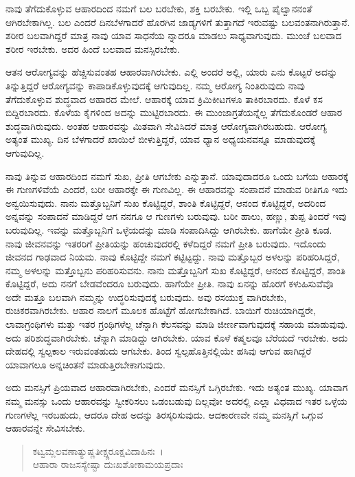 ನಾವು ತೆಗೆದುಕೊಳ್ಳುವ ಆಹಾರದಿಂದ ನಮಗೆ ಬಲ ಬರಬೇಕು, ಶಕ್ತಿ ಬರಬೇಕು. ಇಲ್ಲಿ ಒಬ್ಬ ಪೈಲ್ವಾನನಂತೆ ಆಗಿರಬೇಕಾಗಿಲ್ಲ. ಬಲ ಎಂದರೆ ದಿನಬೆಳಗಾದರೆ ಹೊರಗಿನ ಜಾಡ್ಯಗಳಿಗೆ ತುತ್ತಾಗದೆ ಇರುವಷ್ಟು ಬಲವಂತನಾಗಿರುತ್ತಾನೆ. ಶರೀರ ಬಲವಾಗಿದ್ದರೆ ಮಾತ್ರ ನಾವು ಯಾವ ಸಾಧನೆಯ ನ್ನಾದರೂ ಮಾಡಲು ಸಾಧ್ಯವಾಗುವುದು. ಮುಂಚೆ ಬಲವಾದ ಶರೀರ ಇರಬೇಕು. ಅದರ ಹಿಂದೆ ಬಲವಾದ ಮನಸ್ಸಿರಬೇಕು.

ಆತನ ಆರೋಗ್ಯವನ್ನು ಹೆಚ್ಚಿಸುವಂತಹ ಆಹಾರವಾಗಿರಬೇಕು. ಎಲ್ಲಿ ಅಂದರೆ ಅಲ್ಲಿ, ಯಾರು ಏನು ಕೊಟ್ಟರೆ ಅದನ್ನು ತಿನ್ನುತ್ತಿದ್ದರೆ ಆರೋಗ್ಯವನ್ನು ಕಾಪಾಡಿಕೊಳ್ಳುವುದಕ್ಕೆ ಆಗುವುದಿಲ್ಲ. ನಮ್ಮ ಆರೋಗ್ಯ ನಿಂತಿರುವುದು ನಾವು ತೆಗೆದುಕೊಳ್ಳುವ ಶುದ್ಧವಾದ ಆಹಾರದ ಮೇಲೆ. ಆಹಾರಕ್ಕೆ ಯಾವ ಕ್ರಿಮಿಕೀಟಗಳೂ ತಾಕಿರಬಾರದು. ಕೊಳೆ ಕಸ ಬಿದ್ದಿರಬಾರದು. ಕೊಳೆಯ ಕೈಗಳಿಂದ ಅದನ್ನು ಮುಟ್ಟಿರಬಾರದು. ಈ ಮುಂಜಾಗ್ರತೆಯನ್ನೆಲ್ಲ ತೆಗೆದುಕೊಂಡರೆ ಆಹಾರ ಶುದ್ಧವಾಗಿರುವುದು. ಅಂತಹ ಆಹಾರವನ್ನು ಮಿತವಾಗಿ ಸೇವಿಸಿದರೆ ಮಾತ್ರ ಆರೋಗ್ಯವಾಗಿರಬಹುದು. ಆರೋಗ್ಯ ಅತ್ಯಂತ ಮುಖ್ಯ. ದಿನ ಬೆಳಗಾದರೆ ಖಾಯಿಲೆ ಬೀಳುತ್ತಿದ್ದರೆ, ಯಾವ ಧ್ಯಾನ ಅಧ್ಯಯನವನ್ನೂ ಮಾಡುವುದಕ್ಕೆ ಆಗುವುದಿಲ್ಲ.

ನಾವು ತಿನ್ನುವ ಆಹಾರದಿಂದ ನಮಗೆ ಸುಖ, ಪ್ರೀತಿ ಆಗಬೇಕು ಎನ್ನುತ್ತಾನೆ. ಯಾವುದಾದರೂ ಒಂದು ಬಗೆಯ ಆಹಾರಕ್ಕೆ ಈ ಗುಣಗಳಿವೆಯೆ ಎಂದರೆ, ಬರೀ ಆಹಾರಕ್ಕೇ ಈ ಗುಣವಿಲ್ಲ. ಈ ಆಹಾರವನ್ನು ಸಂಪಾದನೆ ಮಾಡುವ ರೀತಿಗೂ ಇದು ಅನ್ವಯಿಸುವುದು. ನಾನು ಮತ್ತೊಬ್ಬನಿಗೆ ಸುಖ ಕೊಟ್ಟಿದ್ದರೆ, ಶಾಂತಿ ಕೊಟ್ಟಿದ್ದರೆ, ಆನಂದ ಕೊಟ್ಟಿದ್ದರೆ, ಅದರಿಂದ ಅನ್ನವನ್ನು ಸಂಪಾದನೆ ಮಾಡಿದ್ದರೆ ಆಗ ನನಗೂ ಆ ಗುಣಗಳು ಬರುವುವು. ಬರೀ ಹಾಲು, ಹಣ್ಣು, ತುಪ್ಪ ತಿಂದರೆ ಇವು ಬರುವುದಿಲ್ಲ. ಇವನ್ನು ಮತ್ತೊಬ್ಬನಿಗೆ ಒಳ್ಳೆಯದನ್ನು ಮಾಡಿ ಸಂಪಾದಿಸಿದ್ದು ಆಗಿರಬೇಕು. ಹಾಗೆಯೇ ಪ್ರೀತಿ ಕೂಡ. ನಾವು ಜೀವನವನ್ನು ಇತರರಿಗೆ ಪ್ರೀತಿಯನ್ನು ಹಂಚುವುದರಲ್ಲಿ ಕಳೆದಿದ್ದರೆ ನಮಗೆ ಪ್ರೀತಿ ಬರುವುದು. ಇದೊಂದು ಜೀವನದ ಗಾಢವಾದ ನಿಯಮ. ನಾವು ಕೊಟ್ಟಿದ್ದೇ ನಮಗೆ ಕಟ್ಟಿಟ್ಟದ್ದು. ನಾವು ಮತ್ತೊಬ್ಬರ ಅಳಲನ್ನು ಪರಿಹರಿಸಿದ್ದರೆ, ನಮ್ಮ ಅಳಲನ್ನು ಮತ್ತೊಬ್ಬನು ಪರಿಹರಿಸುವನು. ನಾನು ಮತ್ತೊಬ್ಬನಿಗೆ ಸುಖ ಕೊಟ್ಟಿದ್ದರೆ, ಆನಂದ ಕೊಟ್ಟಿದ್ದರೆ, ಶಾಂತಿ ಕೊಟ್ಟಿದ್ದರೆ, ಅದು ನನಗೆ ಬೇಡವೆಂದರೂ ಬರುವುದು. ಹಾಗೆಯೇ ಪ್ರೀತಿ. ನಾವು ಏನನ್ನು ಹೊರಗೆ ಕಳುಹಿಸುವೆವೊ ಅದೇ ಮತ್ತೂ ಬಲವಾಗಿ ನಮ್ಮನ್ನು ಉದ್ಧರಿಸುವುದಕ್ಕೆ ಬರುವುದು. ಅವು ರಸಯುಕ್ತ ವಾಗಿರಬೇಕು, ರುಚಿಕರವಾಗಿರಬೇಕು. ಆಹಾರ ನಾಲಗೆ ಮೂಲಕ ಹೊಟ್ಟೆಗೆ ಹೋಗಬೇಕಾಗಿದೆ. ಬಾಯಿಗೆ ರುಚಿಯಾಗಿದ್ದರೇ, ಲಾವಾಗ್ರಂಥಿಗಳು ಮತ್ತು ಇತರ ಗ್ರಂಥಿಗಳೆಲ್ಲ ಚೆನ್ನಾಗಿ ಕೆಲಸವನ್ನು ಮಾಡಿ ಜೀರ್ಣವಾಗುವುದಕ್ಕೆ ಸಹಾಯ ಮಾಡುವುವು. ಅದು ಪರಿಶುದ್ಧವಾಗಿರಬೇಕು. ಚೆನ್ನಾಗಿ ಮಾಡಿದ್ದು ಆಗಿರಬೇಕು. ಯಾವ ಕೊಳೆ ಕಷ್ಮಲವೂ ಬೆರೆಯದೆ ಇರಬೇಕು. ಅದು ದೇಹದಲ್ಲಿ ಸ್ವಲ್ಪಕಾಲ ಇರುವಂತಹುದು ಆಗಬೇಕು. ತಿಂದ ಸ್ವಲ್ಪಹೊತ್ತಿನಲ್ಲಿಯೇ ಹಸಿವು ಆಗುವ ಹಾಗಿದ್ದರೆ ಯಾವಾಗಲೂ ಅನ್ನಚಿಂತನೆ ಮಾಡುತ್ತಿರಬೇಕಾಗುವುದು.

ಅದು ಮನಸ್ಸಿಗೆ ಪ್ರಿಯವಾದ ಆಹಾರವಾಗಿರಬೇಕು, ಎಂದರೆ ಮನಸ್ಸಿಗೆ ಒಗ್ಗಿರಬೇಕು. ಇದು ಅತ್ಯಂತ ಮುಖ್ಯ. ಯಾವಾಗ ನಮ್ಮ ಮನಸ್ಸು ಒಂದು ಆಹಾರವನ್ನು ಸ್ವೀಕರಿಸಲು ಒಡಂಬಡುವು ದಿಲ್ಲವೋ ಅದರಲ್ಲಿ ಎಲ್ಲಾ ವಿಧವಾದ ಇತರ ಒಳ್ಳೆಯ ಗುಣಗಳೆಲ್ಲ ಇರಬಹುದು, ಆದರೂ ದೇಹ ಅದನ್ನು ತಿರಸ್ಕರಿಸುವುದು. ಆದಕಾರಣವೇ ನಮ್ಮ ಮನಸ್ಸಿಗೆ ಒಗ್ಗುವ ಆಹಾರವನ್ನೇ ಸೇವಿಸಬೇಕು.

\begin{verse}
ಕಟ್ವಮ್ಲಲವಣಾತ್ಯುಷ್ಣತೀಕ್ಷ್ಣರೂಕ್ಷವಿದಾಹಿನಃ~।\\ಆಹಾರಾ ರಾಜಸಸ್ಯೇಷ್ಟಾ ದುಃಖಶೋಕಾಮಯಪ್ರದಾಃ 
\end{verse}

